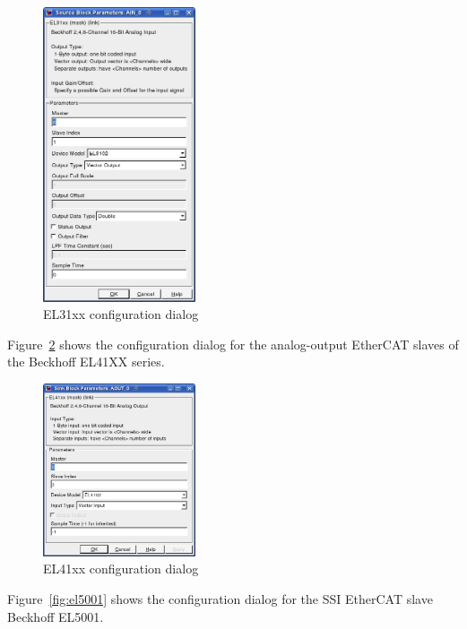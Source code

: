 \begin{figure}[H]
  \begin{center}
    \includegraphics[width=0.4\textwidth]{images/el31xx.png}
    \caption{EL31xx configuration dialog}
    \label{fig:el31xx}
  \end{center}
\end{figure}

Figure~\ref{fig:el41xx} shows the configuration dialog for the
analog-output EtherCAT slaves of the Beckhoff EL41XX series.

\begin{figure}[H]
  \begin{center}
    \includegraphics[width=0.4\textwidth]{images/el41xx.png}
    \caption{EL41xx configuration dialog}
    \label{fig:el41xx}
  \end{center}
\end{figure}

Figure~\ref{fig:el5001} shows the configuration dialog for the SSI
EtherCAT slave Beckhoff EL5001.

